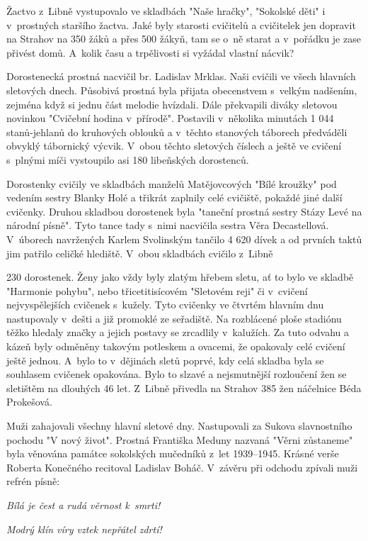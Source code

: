 \documentclass[a5paper, 11pt, twoside]{article}
\begin{document}
Žactvo z~Libně vystupovalo ve skladbách "Naše hračky", "Sokolské děti"
i v~prostných staršího žactva. Jaké byly starosti cvičitelů a cvičitelek
jen dopravit na Strahov na 350 žáků a přes 500 žákyň, tam se o~ně starat
a v~pořádku je zase přivést domů. A~kolik času a trpělivosti si vyžádal
vlastní nácvik?

Dorostenecká prostná nacvičil br. Ladislav Mrklas. Naši cvičili ve všech
hlavních sletových dnech. Působivá prostná byla přijata obecenstvem
s~velkým nadšením, zejména když si jednu část melodie hvízdali. Dále
překvapili diváky sletovou novinkou "Cvičební hodina v~přírodě".
Postavili v~několika minutách 1 044 stanů-jehlanů do kruhových oblouků a
v~těchto stanových táborech předváděli obvyklý tábornický výcvik. V~obou
těchto sletových číslech a ještě ve cvičení s~plnými míči vystoupilo asi
180 libeňských dorostenců.

Dorostenky cvičily ve skladbách manželů Matějovcových "Bílé kroužky"
pod vedením sestry Blanky Holé a třikrát zaplnily celé cvičiště, pokaždé
jiné další cvičenky. Druhou skladbou dorostenek byla "taneční prostná
sestry Stázy Levé na národní písně". Tyto tance tady s~nimi nacvičila
sestra Věra Decastellová. V~úborech navržených Karlem Svolinským tančilo
4 620 dívek a od prvních taktů jim patřilo celičké hlediště. V~obou
skladbách cvičilo z~Libně

230 dorostenek. Ženy jako vždy byly zlatým hřebem sletu, ať to bylo ve
skladbě "Harmonie pohybu", nebo třicetitisícovém "Sletovém reji" či
v~cvičení nejvyspělejších cvičenek s~kužely. Tyto cvičenky ve čtvrtém
hlavním dnu nastupovaly v~dešti a již promoklé ze seřadiště. Na
rozblácené ploše stadiónu těžko hledaly značky a jejich postavy se
zrcadlily v~kalužích. Za tuto odvahu a kázeň byly odměněny takovým
potleskem a ovacemi, že opakovaly celé cvičení ještě jednou. A~bylo to
v~dějinách sletů poprvé, kdy celá skladba byla se souhlasem cvičenek
opakována. Bylo to slzavé a nejsmutnější rozloučení žen se sletištěm na
dlouhých 46 let. Z~Libně přivedla na Strahov 385 žen náčelnice Béda
Prokešová.

Muži zahajovali všechny hlavní sletové dny. Nastupovali za Sukova
slavnostního pochodu "V nový život". Prostná Františka Meduny nazvaná
"Věrni zůstaneme" byla věnována památce sokolských mučedníků z~let
1939--1945. Krásné verše Roberta Konečného recitoval Ladislav
Boháč. V~závěru při odchodu zpívali muži refrén písně:

\textit{Bílá je čest a rudá věrnost k~smrti!}

\textit{Modrý klín víry vztek nepřátel zdrtí!}
\end{document}
